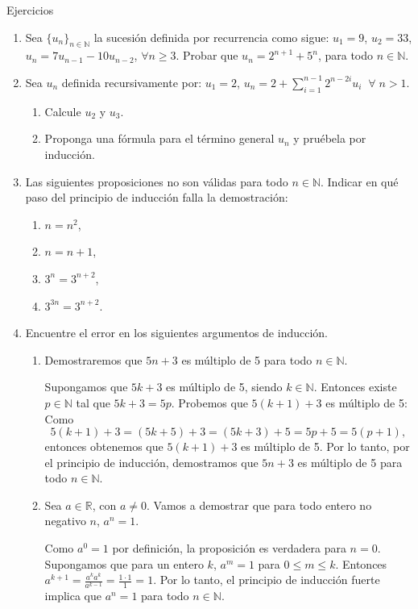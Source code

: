 \begin{section}{Ejercicios}
\begin{enumerate}
        \item Sea $\{ u_n \}_{n \in \mathbb N}$ la sucesión definida por recurrencia como sigue: $u_1 = 9$, $u_2 = 33$, $u_n = 7u_{n-1} - 10u_{n-2}$, $\forall n \geq 3$. Probar que $u_n = 2^{n+1} + 5^n$, para todo $n \in \mathbb N$.

        \item Sea $u_n$ definida recursivamente por: $u_1=2$, $u_n=2+\sum_{i=1}^{n-1}2^{n-2i}u_i \;\;\forall\; n >1$.
        \begin{enumerate}
            \item Calcule $u_2$ y $u_3$.
            \item Proponga una fórmula para el término general $u_n$ y pruébela por inducción.
        \end{enumerate}

        \item Las siguientes proposiciones no son válidas para todo $n \in {\mathbb N}$. Indicar en qué paso del principio de inducción falla la demostración:
        \begin{multicols}{4}
        \begin{enumerate}
            \item  $n=n^2$,
            \item  $n=n+1$,
            \item  $3^n = 3^{n+2}$,
            \item  $3^{3n} = 3^{n+2}$.
        \end{enumerate}
        \end{multicols}

        \item Encuentre el error en los siguientes argumentos de inducción.
        \begin{enumerate}
            \item  Demostraremos que $5n+3$ es múltiplo de 5 para todo $n\in \mathbb N$.

            Supongamos que $5k+3$ es múltiplo de 5, siendo $k\in \mathbb N$. Entonces existe
            $p\in \mathbb N$ tal que  $5k+3=5p$. Probemos que $5(k+1)+3$ es múltiplo de 5:
            Como
            $$
            5(k+1)+3=(5k+5)+3=(5k+3)+5=5p+5=5(p+1),
            $$
            entonces obtenemos que $5(k+1)+3$ es múltiplo de 5. Por lo tanto, por el principio
            de inducción, demostramos que $5n+3$ es múltiplo de 5 para todo $n\in \mathbb
            N$.
            \item Sea $a\in\mathbb R$, con $a\neq 0$. Vamos a demostrar que para todo entero no negativo $n$, $a^n=1$.

            Como $a^0=1$ por definición, la proposición es verdadera para $n=0$. Supongamos
            que para  un entero $k$, $a^m=1$ para $0\leq m \leq k$. Entonces
            $a^{k+1}= \frac{a^k a^k}{a^{k-1}}=\frac{1\cdot1}1=1$.
            Por lo tanto, el principio de inducción fuerte implica que $a^n=1$ para todo $n\in \mathbb N$.
        \end{enumerate}
    \end{enumerate}
\end{section}